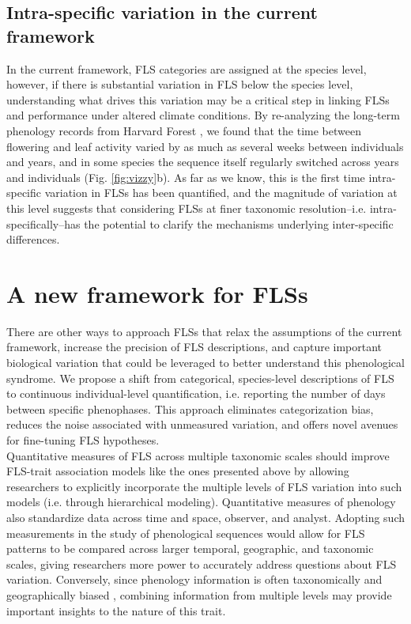 \documentclass{article}
\begin{document}
\subsection*{Intra-specific variation in the current framework}
\noindent In the current framework, FLS categories are assigned at the species level, however, if there is substantial variation in FLS below the species level, understanding what drives this variation  may be a critical step in linking FLSs and performance under altered climate conditions. By re-analyzing the long-term phenology records from  Harvard Forest \citep{OKeefe2015}, we found that the time between flowering and leaf activity varied by as much as several weeks between individuals and years, and in some species the sequence itself regularly switched across years and individuals  (Fig. \ref{fig:vizzy}b). As far as we know, this is the first time intra-specific variation in FLSs has been quantified, and the magnitude of variation at this level suggests that considering FLSs at finer taxonomic resolution--i.e. intra-specifically--has the potential to clarify the mechanisms underlying inter-specific differences.\\

\section*{A new framework for FLSs} %

\noindent There are other ways to approach FLSs that relax the assumptions of the current framework, increase the precision of FLS descriptions, and capture important biological variation that could be leveraged to better understand this phenological syndrome. We propose a shift from categorical, species-level descriptions of FLS to continuous individual-level quantification, i.e. reporting the number of days between specific phenophases. This approach eliminates categorization bias, reduces the noise associated with unmeasured variation, and offers novel avenues for fine-tuning FLS hypotheses.\\ 


\noindent  Quantitative measures of FLS across multiple taxonomic scales should improve FLS-trait association models like the ones presented above by allowing researchers to explicitly incorporate the multiple levels of FLS variation into such models (i.e. through hierarchical modeling). Quantitative measures of phenology \citep[e.g. the BBCH scale,][]{Finn2007} also standardize data across time and space, observer, and analyst. Adopting such measurements in the study of phenological sequences would allow for FLS patterns to be compared across larger temporal, geographic, and taxonomic scales, giving researchers more power to accurately address questions about FLS variation. Conversely, since phenology information is often taxonomically and geographically biased \citep{Wolkovich2014,Willis2017}, combining information from multiple levels may provide important insights to the nature of this trait. \\
\end{document}
